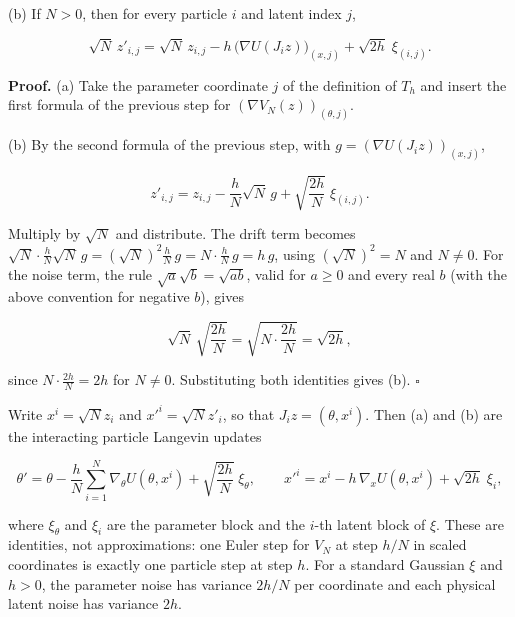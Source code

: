 \documentclass[11pt,a4paper]{article}
\begin{document}
(b) If \(N>0\), then for every particle \(i\) and latent index \(j\),


\[\sqrt N\,z'_{i,j}=\sqrt N\,z_{i,j}-h\,\bigl(\nabla U(J_iz)\bigr)_{(x,j)}+\sqrt{2h}\;\xi_{(i,j)} .\]


\textbf{Proof.} (a) Take the parameter coordinate \(j\) of the definition of \(T_h\) and insert the first formula of the previous step for \((\nabla V_N(z))_{(\theta,j)}\).




(b) By the second formula of the previous step, with \(g=(\nabla U(J_iz))_{(x,j)}\),


\[z'_{i,j}=z_{i,j}-\frac hN\sqrt N\,g+\sqrt{\frac{2h}N}\;\xi_{(i,j)} .\]


Multiply by \(\sqrt N\) and distribute. The drift term becomes \(\sqrt N\cdot\frac hN\sqrt N\,g=(\sqrt N)^2\frac hN\,g=N\cdot\frac hN\,g=h\,g\), using \((\sqrt N)^2=N\) and \(N\ne0\). For the noise term, the rule \(\sqrt a\sqrt b=\sqrt{ab}\), valid for \(a\ge0\) and every real \(b\) (with the above convention for negative \(b\)), gives


\[\sqrt N\,\sqrt{\frac{2h}N}=\sqrt{N\cdot\frac{2h}N}=\sqrt{2h},\]


since \(N\cdot\frac{2h}N=2h\) for \(N\ne0\). Substituting both identities gives (b). \(\square\)




Write \(x^i=\sqrt Nz_i\) and \(x'^i=\sqrt Nz'_i\), so that \(J_iz=(\theta,x^i)\). Then (a) and (b) are the interacting particle Langevin updates


\[\theta'=\theta-\frac hN\sum_{i=1}^N\nabla_\theta U(\theta,x^i)+\sqrt{\frac{2h}N}\;\xi_\theta,\qquad x'^i=x^i-h\,\nabla_xU(\theta,x^i)+\sqrt{2h}\;\xi_i,\]


where \(\xi_\theta\) and \(\xi_i\) are the parameter block and the \(i\)-th latent block of \(\xi\). These are identities, not approximations: one Euler step for \(V_N\) at step \(h/N\) in scaled coordinates is exactly one particle step at step \(h\). For a standard Gaussian \(\xi\) and \(h>0\), the parameter noise has variance \(2h/N\) per coordinate and each physical latent noise has variance \(2h\).
\end{document}

